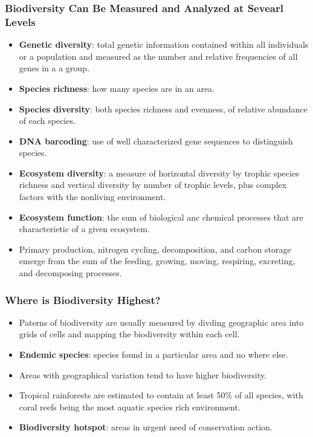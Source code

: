 \documentclass[12pt,a4paper]{article}
\begin{document}
\subsubsection{Biodiversity Can Be Measured and Analyzed at Sevearl Levels}
\begin{itemize}
    \item \textbf{Genetic diversity}: total genetic information contained within all individuals or a population and measured as the number and relative frequencies of all genes in a a group.
    \item \textbf{Species richness}: how many species are in an area.
    \item \textbf{Species diversity}: both species richness and evenness, of relative abundance of each species.
    \item \textbf{DNA barcoding}: use of well characterized gene sequences to distinguish species.
    \item \textbf{Ecosystem diversity}: a measure of horizontal diversity by trophic species richness and vertical diversity by number of trophic levels, plus complex factors with the nonliving environment. 
    \item \textbf{Ecosystem function}: the sum of biological anc chemical processes that are characterietic of a given ecosystem. 
    \item Primary production, nitrogen cycling, decomposition, and carbon storage emerge from the sum of the feeding, growing, moving, respiring, excreting, and decomposing processes.
\end{itemize}

\subsubsection{Where is Biodiversity Highest?}
\begin{itemize}
    \item Paterns of biodiversity are usually measured by divding geographic area into grids of cells and mapping the biodiversity within each cell.
    \item \textbf{Endemic species}: species found in a particular area and no where else.
    \item Areas with geographical variation tend to have higher biodiversity.
    \item Tropical rainforests are estimated to contain at least 50\% of all species, with coral reefs being the most aquatic species rich environment.
    \item \textbf{Biodiversity hotspot}: areas in urgent need of conservation action.
\end{itemize}
\end{document}
